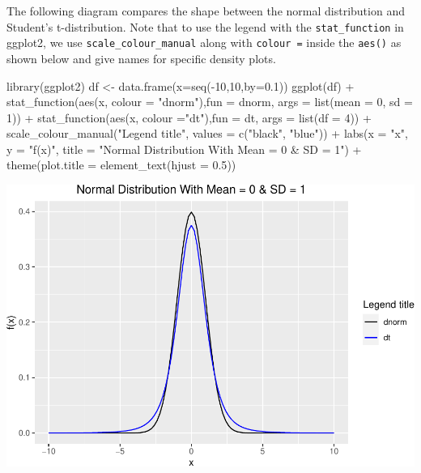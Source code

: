 \documentclass[landscape, 20pt]{extreport}
\newenvironment{Shaded}{\begin{snugshade}}{\end{snugshade}}
\newcommand{\AttributeTok}[1]{\textcolor[rgb]{0.77,0.63,0.00}{#1}}
\newcommand{\DecValTok}[1]{\textcolor[rgb]{0.00,0.00,0.81}{#1}}
\newcommand{\FloatTok}[1]{\textcolor[rgb]{0.00,0.00,0.81}{#1}}
\newcommand{\FunctionTok}[1]{\textcolor[rgb]{0.00,0.00,0.00}{#1}}
\newcommand{\NormalTok}[1]{#1}
\newcommand{\OtherTok}[1]{\textcolor[rgb]{0.56,0.35,0.01}{#1}}
\newcommand{\SpecialCharTok}[1]{\textcolor[rgb]{0.00,0.00,0.00}{#1}}
\newcommand{\StringTok}[1]{\textcolor[rgb]{0.31,0.60,0.02}{#1}}
\theoremstyle{definition}
\theoremstyle{definition}
\theoremstyle{definition}
\theoremstyle{definition}
\theoremstyle{remark}
\begin{document}
The following diagram compares the shape between the normal distribution and Student's t-distribution. Note that to use the legend with the \texttt{stat\_function} in ggplot2, we use \texttt{scale\_colour\_manual} along with \texttt{colour\ =} inside the \texttt{aes()} as shown below and give names for specific density plots.

\begin{Shaded}
\begin{Highlighting}[]
\FunctionTok{library}\NormalTok{(ggplot2)}
\NormalTok{df }\OtherTok{\textless{}{-}} \FunctionTok{data.frame}\NormalTok{(}\AttributeTok{x=}\FunctionTok{seq}\NormalTok{(}\SpecialCharTok{{-}}\DecValTok{10}\NormalTok{,}\DecValTok{10}\NormalTok{,}\AttributeTok{by=}\FloatTok{0.1}\NormalTok{))}
\FunctionTok{ggplot}\NormalTok{(df) }\SpecialCharTok{+} 
    \FunctionTok{stat\_function}\NormalTok{(}\FunctionTok{aes}\NormalTok{(x, }\AttributeTok{colour =} \StringTok{"dnorm"}\NormalTok{),}\AttributeTok{fun =}\NormalTok{ dnorm, }\AttributeTok{args =} \FunctionTok{list}\NormalTok{(}\AttributeTok{mean =} \DecValTok{0}\NormalTok{, }\AttributeTok{sd =} \DecValTok{1}\NormalTok{))  }\SpecialCharTok{+} 
    \FunctionTok{stat\_function}\NormalTok{(}\FunctionTok{aes}\NormalTok{(x, }\AttributeTok{colour =}\StringTok{"dt"}\NormalTok{),}\AttributeTok{fun =}\NormalTok{ dt, }\AttributeTok{args =} \FunctionTok{list}\NormalTok{(}\AttributeTok{df =} \DecValTok{4}\NormalTok{)) }\SpecialCharTok{+}
     \FunctionTok{scale\_colour\_manual}\NormalTok{(}\StringTok{"Legend title"}\NormalTok{, }\AttributeTok{values =} \FunctionTok{c}\NormalTok{(}\StringTok{"black"}\NormalTok{, }\StringTok{"blue"}\NormalTok{)) }\SpecialCharTok{+} 
    \FunctionTok{labs}\NormalTok{(}\AttributeTok{x =} \StringTok{"x"}\NormalTok{, }\AttributeTok{y =} \StringTok{"f(x)"}\NormalTok{, }
       \AttributeTok{title =} \StringTok{"Normal Distribution With Mean = 0 \& SD = 1"}\NormalTok{) }\SpecialCharTok{+} 
  \FunctionTok{theme}\NormalTok{(}\AttributeTok{plot.title =} \FunctionTok{element\_text}\NormalTok{(}\AttributeTok{hjust =} \FloatTok{0.5}\NormalTok{))}
\end{Highlighting}
\end{Shaded}

\includegraphics{unnamed-chunk-3-1.pdf}
\end{document}
